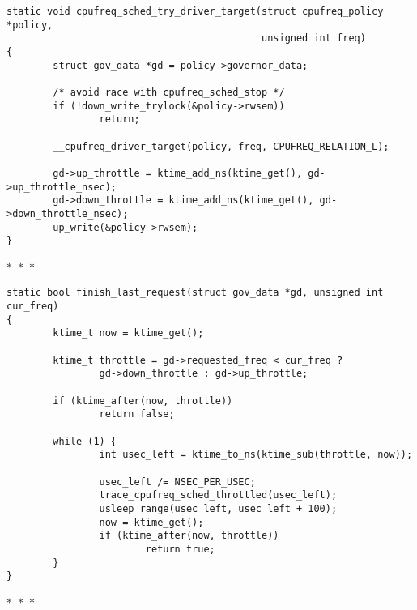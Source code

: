 \documentclass{article}
\newcommand{\divider}{{\begin{center}
  $\ast$~$\ast$~$\ast$
\end{center}}}
\begin{document}
\begin{verbatim}
static void cpufreq_sched_try_driver_target(struct cpufreq_policy *policy,
                                            unsigned int freq)
{
        struct gov_data *gd = policy->governor_data;

        /* avoid race with cpufreq_sched_stop */
        if (!down_write_trylock(&policy->rwsem))
                return;

        __cpufreq_driver_target(policy, freq, CPUFREQ_RELATION_L);

        gd->up_throttle = ktime_add_ns(ktime_get(), gd->up_throttle_nsec);
        gd->down_throttle = ktime_add_ns(ktime_get(), gd->down_throttle_nsec);
        up_write(&policy->rwsem);
}
\end{verbatim}
\divider
\begin{verbatim}
static bool finish_last_request(struct gov_data *gd, unsigned int cur_freq)
{
        ktime_t now = ktime_get();

        ktime_t throttle = gd->requested_freq < cur_freq ?
                gd->down_throttle : gd->up_throttle;

        if (ktime_after(now, throttle))
                return false;

        while (1) {
                int usec_left = ktime_to_ns(ktime_sub(throttle, now));

                usec_left /= NSEC_PER_USEC;
                trace_cpufreq_sched_throttled(usec_left);
                usleep_range(usec_left, usec_left + 100);
                now = ktime_get();
                if (ktime_after(now, throttle))
                        return true;
        }
}
\end{verbatim}
\divider
\end{document}
